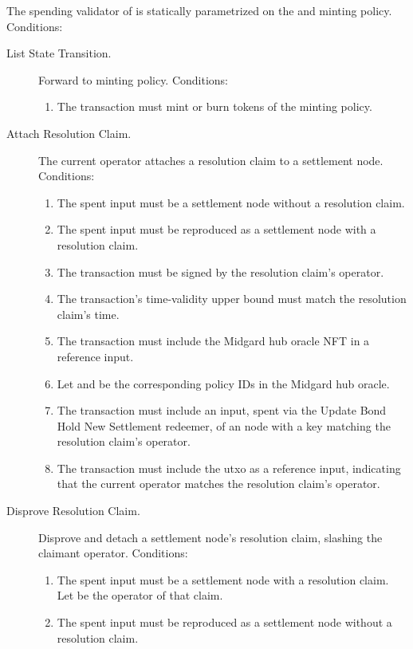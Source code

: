\documentclass[../midgard.tex]{subfiles}
\begin{document}
The spending validator of  is statically parametrized on the  and  minting policy.
Conditions:
\begin{description}
  \item[List State Transition.] Forward to minting policy.
    Conditions:
      \begin{enumerate}
          \item The transaction must mint or burn tokens of the  minting policy.
      \end{enumerate}
  \item[Attach Resolution Claim.] The current operator attaches a resolution claim to a settlement node.
    Conditions:
      \begin{enumerate}
        \item The spent input must be a settlement node without a resolution claim.
        \item The spent input must be reproduced as a settlement node with a resolution claim.
        \item The transaction must be signed by the resolution claim's operator.
        \item The transaction's time-validity upper bound must match the resolution claim's time.
        \item The transaction must include the Midgard hub oracle NFT in a reference input.
        \item Let  and  be the corresponding policy IDs in the Midgard hub oracle.
        \item The transaction must include an input, spent via the Update Bond Hold New Settlement redeemer, of an  node with a key matching the resolution claim's operator.
        \item The transaction must include the  utxo as a reference input, indicating that the current operator matches the resolution claim's operator.
      \end{enumerate}
  \item[Disprove Resolution Claim.] Disprove and detach a settlement node's resolution claim, slashing the claimant operator.
    Conditions:
      \begin{enumerate}
        \item The spent input must be a settlement node with a resolution claim.
          Let  be the operator of that claim.
        \item The spent input must be reproduced as a settlement node without a resolution claim.

\end{enumerate}
\end{description}
\end{document}
